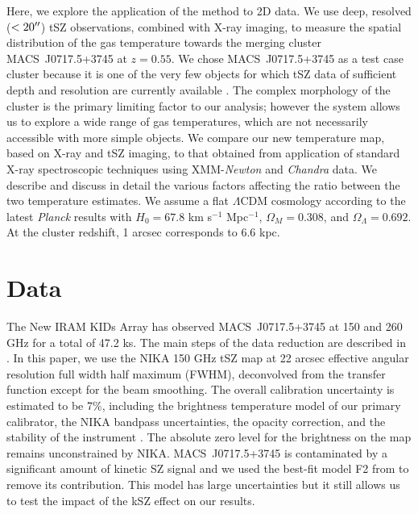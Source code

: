 \documentclass[twocolumn,traditabstract]{aa}
\begin{document}
Here, we explore the application of the method to 2D data. We use deep, resolved ($< 20\hbox{$^{\prime\prime}$}$) tSZ observations, combined with X-ray imaging, to measure the spatial distribution of the gas temperature towards the merging cluster \mbox{MACS~J0717.5+3745} at $z=0.55$. We chose \mbox{MACS~J0717.5+3745} as a test case cluster because it is one of the very few objects for which tSZ data of sufficient depth and resolution are currently available \citep{Adam2016b}. The complex morphology of the cluster is the primary limiting factor to our analysis; however the system allows us to explore a wide range of gas temperatures, which are not necessarily accessible with more simple objects. We compare our new temperature map, based on X-ray and tSZ imaging, to that obtained from application of standard X-ray spectroscopic techniques using XMM-\textit{Newton} and \textit{Chandra} data. We describe and discuss in detail the various factors affecting the ratio between the two temperature estimates.
We assume a flat $\Lambda$CDM cosmology according to the latest {\it Planck} results \citep{Planck2015XIII} with $H_0 = 67.8$ km s$^{-1}$ Mpc$^{-1}$, $\Omega_M = 0.308$, and $\Omega_{\Lambda} = 0.692$. At the cluster redshift, 1 arcsec corresponds to 6.6 kpc.

\section{Data}\label{sec:data}
The New IRAM KIDs Array \citep[NIKA; see][]{Monfardini2011,Calvo2013,Adam2014,Catalano2014} has observed \mbox{MACS~J0717.5+3745} at 150 and 260 GHz for a total of 47.2 ks. The main steps of the data reduction are described in \cite{Adam2015,Adam2016a,Adam2016b,Ruppin2016}. In this paper, we use the NIKA 150 GHz tSZ map at 22 arcsec effective angular resolution full width half maximum (FWHM), deconvolved from the transfer function except for the beam smoothing. The overall calibration uncertainty is estimated to be 7\%, including the brightness temperature model of our primary calibrator, the NIKA bandpass uncertainties, the opacity correction, and the stability of the instrument \citep{Catalano2014}. The absolute zero level for the brightness on the map remains unconstrained by NIKA. \mbox{MACS~J0717.5+3745} is contaminated by a significant amount of kinetic SZ \citep[kSZ;][]{Sunyaev1980} signal and we used the best-fit model F2 from \cite{Adam2016b} to remove its contribution. This model has large uncertainties but it still allows us to test the impact of the kSZ effect on our results.
\end{document}
